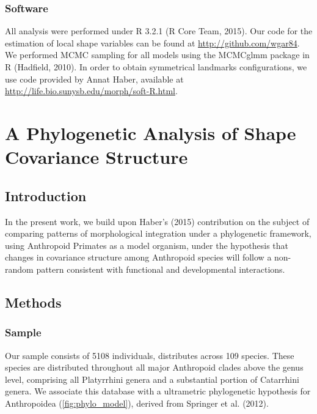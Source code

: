 \documentclass[12pt,twoside]{report}
\begin{document}
\subsection{Software}\label{software-1}

All analysis were performed under R 3.2.1 (R Core Team, 2015). Our code
for the estimation of local shape variables can be found at
\url{http://github.com/wgar84}. We performed MCMC sampling for all
models using the MCMCglmm package in R (Hadfield, 2010). In order to
obtain symmetrical landmarks configurations, we use code provided by
Annat Haber, available at
\url{http://life.bio.sunysb.edu/morph/soft-R.html}.

\newpage
\chapter{A Phylogenetic Analysis of Shape Covariance Structure}
\label{ch:ppca}

\section{Introduction}\label{introduction-2}

In the present work, we build upon Haber's (2015) contribution on the
subject of comparing patterns of morphological integration under a
phylogenetic framework, using Anthropoid Primates as a model organism,
under the hypothesis that changes in covariance structure among
Anthropoid species will follow a non-random pattern consistent with
functional and developmental interactions.

\section{Methods}\label{methods-2}

\subsection{Sample}\label{sample-2}

Our sample consists of 5108 individuals, distributes across 109 species.
These species are distributed throughout all major Anthropoid clades
above the genus level, comprising all Platyrrhini genera and a
substantial portion of Catarrhini genera. We associate this database
with a ultrametric phylogenetic hypothesis for Anthropoidea
(\autoref{fig:phylo_model}), derived from Springer et al. (2012).
\end{document}
